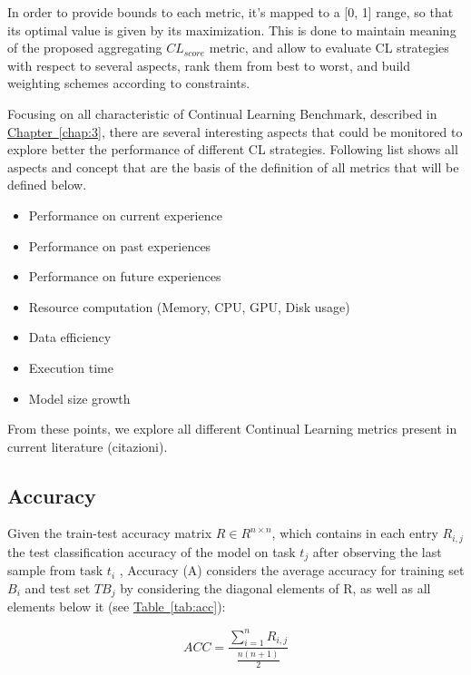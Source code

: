 \documentclass[english, LaM, oneside]{sapthesis}%
\begin{document}
In order to provide bounds to each metric, it's mapped to a [0, 1] range, so that its optimal value is given by its maximization. This is done to maintain meaning of the proposed aggregating $CL_{score}$ metric, and allow to evaluate CL strategies with respect to several aspects, rank them from best to worst, and build weighting schemes according to constraints.
\vspace{5mm}

Focusing on all characteristic of Continual Learning Benchmark, described in \hyperref[chap:3]{Chapter~\ref*{chap:3}}, there are several interesting aspects that could be monitored to explore better the performance of different CL strategies. Following list shows all aspects and concept that are the basis of the definition of all metrics that will be defined below.

\begin{itemize}
    \item Performance on current experience
    \item Performance on past experiences
    \item Performance on future experiences
    \item Resource computation (Memory, CPU, GPU, Disk usage)
    \item Data efficiency
    \item Execution time
    \item Model size growth
\end{itemize}

From these points, we explore all different Continual Learning metrics present in current literature (citazioni).
\subsection{Accuracy}
Given the train-test accuracy matrix $R \in R^{n×n}$, which contains in each entry $R_{i,j}$ the test classification accuracy of the model on task $t_j$ after observing the last sample from task $t_i$ \cite{lopez}, Accuracy (A) considers the average accuracy for training set $B_i$ and test set $TB_j$ by considering the diagonal elements of R, as well as all elements below it (see \hyperref[tab:acc]{Table~\ref*{tab:acc}}):

\begin{equation}
                 ACC = \frac{\sum_{i=1}^{n}{R_{i,j}}}{\frac{n(n+1)}{2} } 
\end{equation}
\vspace{5mm}
\end{document}

